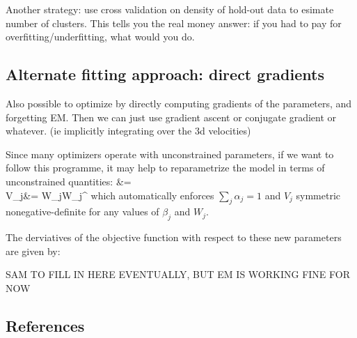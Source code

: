 \documentclass{article}
\def\beqa#1\eeqa{\begin{eqnarray}#1\end{eqnarray}}
\newcommand{\T}{^{\scriptscriptstyle \top}}
\newcommand{\<}{\langle}
\renewcommand{\>}{\rangle}
\newcommand{\WWj}{W_j}
\newcommand{\VVj}{V_j}
\newcommand{\alphaj}{\alpha_j}
\newcommand{\betaj}{\beta_j}
\begin{document}
Another strategy: use cross validation on density of hold-out data to
esimate number of clusters. This tells you the real money answer: if
you had to pay for overfitting/underfitting, what would you do.


\subsection{Alternate fitting approach: direct gradients}

Also possible to optimize by directly computing gradients of
the parameters, and forgetting EM. Then we can just use gradient
ascent or conjugate gradient or whatever. (ie implicitly integrating
over the 3d velocities)

Since many optimizers operate with unconstrained
parameters, if we want to follow this programme, it may help to
reparametrize the model in terms of unconstrained quantities:
\beqa
\alphaj &= \frac{\exp(\betaj)}{\sum_{j'} \exp(\beta_{j'})}\\
\VVj &= \WWj\WWj\T
\eeqa
which automatically enforces $\sum_j \alphaj =1$ and $\VVj$ symmetric
nonegative-definite for any values of $\betaj$ and $\WWj$.

The derviatives of the objective function with respect
to these new parameters are given by:

SAM TO FILL IN HERE EVENTUALLY, BUT EM IS WORKING FINE FOR NOW

\subsection*{References}
\end{document}
